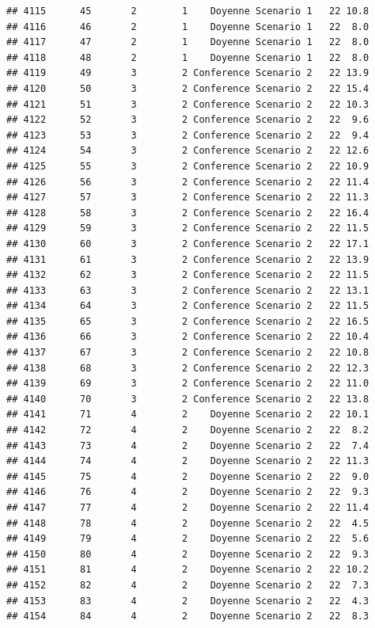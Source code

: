 \documentclass[
]{article}
\begin{document}
\begin{verbatim}
## 4115      45       2        1    Doyenne Scenario 1   22 10.8
## 4116      46       2        1    Doyenne Scenario 1   22  8.0
## 4117      47       2        1    Doyenne Scenario 1   22  8.0
## 4118      48       2        1    Doyenne Scenario 1   22  8.0
## 4119      49       3        2 Conference Scenario 2   22 13.9
## 4120      50       3        2 Conference Scenario 2   22 15.4
## 4121      51       3        2 Conference Scenario 2   22 10.3
## 4122      52       3        2 Conference Scenario 2   22  9.6
## 4123      53       3        2 Conference Scenario 2   22  9.4
## 4124      54       3        2 Conference Scenario 2   22 12.6
## 4125      55       3        2 Conference Scenario 2   22 10.9
## 4126      56       3        2 Conference Scenario 2   22 11.4
## 4127      57       3        2 Conference Scenario 2   22 11.3
## 4128      58       3        2 Conference Scenario 2   22 16.4
## 4129      59       3        2 Conference Scenario 2   22 11.5
## 4130      60       3        2 Conference Scenario 2   22 17.1
## 4131      61       3        2 Conference Scenario 2   22 13.9
## 4132      62       3        2 Conference Scenario 2   22 11.5
## 4133      63       3        2 Conference Scenario 2   22 13.1
## 4134      64       3        2 Conference Scenario 2   22 11.5
## 4135      65       3        2 Conference Scenario 2   22 16.5
## 4136      66       3        2 Conference Scenario 2   22 10.4
## 4137      67       3        2 Conference Scenario 2   22 10.8
## 4138      68       3        2 Conference Scenario 2   22 12.3
## 4139      69       3        2 Conference Scenario 2   22 11.0
## 4140      70       3        2 Conference Scenario 2   22 13.8
## 4141      71       4        2    Doyenne Scenario 2   22 10.1
## 4142      72       4        2    Doyenne Scenario 2   22  8.2
## 4143      73       4        2    Doyenne Scenario 2   22  7.4
## 4144      74       4        2    Doyenne Scenario 2   22 11.3
## 4145      75       4        2    Doyenne Scenario 2   22  9.0
## 4146      76       4        2    Doyenne Scenario 2   22  9.3
## 4147      77       4        2    Doyenne Scenario 2   22 11.4
## 4148      78       4        2    Doyenne Scenario 2   22  4.5
## 4149      79       4        2    Doyenne Scenario 2   22  5.6
## 4150      80       4        2    Doyenne Scenario 2   22  9.3
## 4151      81       4        2    Doyenne Scenario 2   22 10.2
## 4152      82       4        2    Doyenne Scenario 2   22  7.3
## 4153      83       4        2    Doyenne Scenario 2   22  4.3
## 4154      84       4        2    Doyenne Scenario 2   22  8.3

\end{verbatim}
\end{document}
